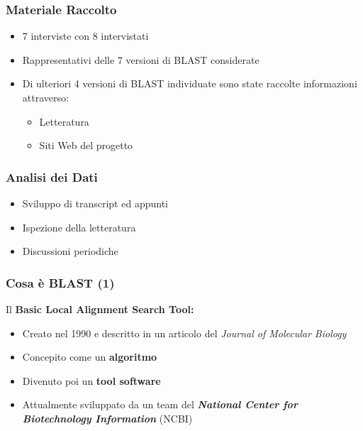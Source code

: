 \begin{frame}\frametitle{Materiale Raccolto}

\begin{itemize}[<+->]
\itemsep1pt\parskip0pt
\item
  7 interviste con 8 intervistati
\item
  Rappresentativi delle 7 versioni di BLAST considerate
\item
  Di ulteriori 4 versioni di BLAST individuate sono state raccolte
  informazioni attraverso:

  \begin{itemize}[<+->]
  \itemsep1pt\parskip0pt
  \item
    Letteratura
  \item
    Siti Web del progetto
  \end{itemize}
\end{itemize}

\end{frame}

\begin{frame}\frametitle{Analisi dei Dati}

\begin{itemize}[<+->]
\itemsep1pt\parskip0pt
\item
  Sviluppo di transcript ed appunti
\item
  Ispezione della letteratura
\item
  Discussioni periodiche
\end{itemize}

\end{frame}

\begin{frame}\frametitle{Cosa è BLAST (1)}

Il
\textbf{\alert{B}asic \alert{L}ocal \alert{A}lignment \alert{S}earch \alert{T}ool:}

\begin{itemize}[<+->]
\itemsep1pt\parskip0pt
\item
  Creato nel 1990 e descritto in un articolo del \emph{Journal of
  Molecular Biology}
\item
  Concepito come un \textbf{algoritmo}
\item
  Divenuto poi un \textbf{tool software}
\item
  Attualmente sviluppato da un team del \emph{\textbf{National Center
  for Biotechnology Information}} (NCBI)
\end{itemize}

\end{frame}

